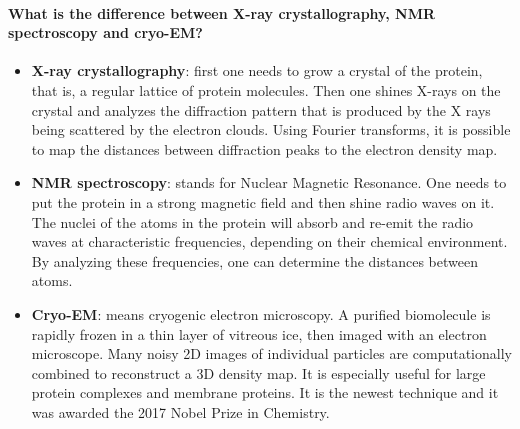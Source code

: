 \paragraph{What is the difference between X-ray crystallography, NMR spectroscopy and cryo-EM?}

\begin{itemize}
    \item \textbf{X-ray crystallography}: first one needs to grow a crystal of the protein, that is, a regular lattice of protein molecules. Then one shines X-rays on the crystal and analyzes the diffraction pattern that is produced by the X rays being scattered by the electron clouds. Using Fourier transforms, 
    it is possible to map the distances between diffraction peaks to the electron density map. 
    \item \textbf{NMR spectroscopy}: stands for Nuclear Magnetic Resonance. One needs to put the protein in a strong magnetic field and then shine radio waves on it. The nuclei of the atoms in the protein will absorb and re-emit the radio waves at characteristic frequencies, depending on their chemical environment. By analyzing these frequencies, one can determine the distances between atoms. 
    \item \textbf{Cryo-EM}: means cryogenic electron microscopy. A purified biomolecule is rapidly frozen in a thin layer of vitreous ice, then imaged with an electron microscope. Many noisy 2D images of individual particles are computationally combined to reconstruct a 3D density map.
        It is especially useful for large protein complexes and membrane proteins. It is the newest technique and it was awarded the 2017 Nobel Prize in Chemistry. 
\end{itemize}

